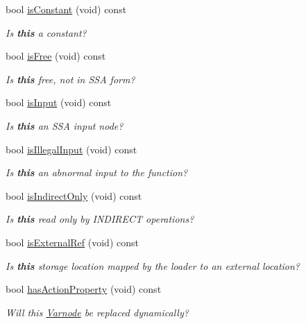 \begin{DoxyCompactItemize}
bool \mbox{\hyperlink{class_varnode_a11850c09d941e033fc0203673335a861}{is\+Constant}} (void) const
\begin{DoxyCompactList}\small\item\em Is {\bfseries{this}} a constant? \end{DoxyCompactList}\item 
bool \mbox{\hyperlink{class_varnode_a4e94e389fbd82df4b13352d9b8a5f1f4}{is\+Free}} (void) const
\begin{DoxyCompactList}\small\item\em Is {\bfseries{this}} free, not in S\+SA form? \end{DoxyCompactList}\item 
bool \mbox{\hyperlink{class_varnode_abfb9d8749d88eacbb2d5b61900afb4a2}{is\+Input}} (void) const
\begin{DoxyCompactList}\small\item\em Is {\bfseries{this}} an S\+SA input node? \end{DoxyCompactList}\item 
bool \mbox{\hyperlink{class_varnode_a6d3bb6ddab597923f9a734f3985d12e2}{is\+Illegal\+Input}} (void) const
\begin{DoxyCompactList}\small\item\em Is {\bfseries{this}} an abnormal input to the function? \end{DoxyCompactList}\item 
bool \mbox{\hyperlink{class_varnode_a232e7f2c37583404969a8dfb0fb4adae}{is\+Indirect\+Only}} (void) const
\begin{DoxyCompactList}\small\item\em Is {\bfseries{this}} read only by I\+N\+D\+I\+R\+E\+CT operations? \end{DoxyCompactList}\item 
bool \mbox{\hyperlink{class_varnode_a93e31966bc3f8102e49438e18c8bb8da}{is\+External\+Ref}} (void) const
\begin{DoxyCompactList}\small\item\em Is {\bfseries{this}} storage location mapped by the loader to an external location? \end{DoxyCompactList}\item 
bool \mbox{\hyperlink{class_varnode_aa3b790c304c4a2868001d2ea794e7582}{has\+Action\+Property}} (void) const
\begin{DoxyCompactList}\small\item\em Will this \mbox{\hyperlink{class_varnode}{Varnode}} be replaced dynamically? \end{DoxyCompactList}\item 

\end{DoxyCompactItemize}
